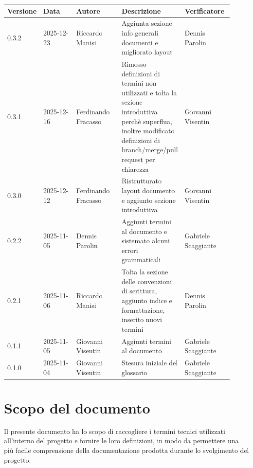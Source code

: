 \documentclass[a4paper,12pt]{article}
\begin{document}
\begin{center}
\small
\renewcommand{\arraystretch}{1.2} 
\begin{tabular}{|p{0.1\linewidth}|p{0.18\linewidth}|p{0.22\linewidth}|p{0.20\linewidth}|p{0.22\linewidth}|}
\hline
\rowcolor{gray!60} 
\textbf{Versione} & \textbf{Data} & \textbf{Autore} & \textbf{Descrizione} & \textbf{Verificatore} \\
\hline
\rowcolor{gray!20}
0.3.2 & 2025-12-23 & Riccardo Manisi & Aggiunta sezione info generali documenti e migliorato layout & Dennis Parolin\\
\hline
\rowcolor{white}
0.3.1 & 2025-12-16 & Ferdinando Fracasso & Rimosso definizioni di termini non utilizzati e tolta la sezione introduttiva perchè superflua, inoltre modificato definizioni di branch/merge/pull request per chiarezza & Giovanni Visentin\\
\hline
\rowcolor{gray!20}
0.3.0 & 2025-12-12 & Ferdinando Fracasso & Ristrutturato layout documento e aggiunto sezione introduttiva & Giovanni Visentin\\
\hline
\rowcolor{white}
0.2.2 & 2025-11-05 & Dennis Parolin & Aggiunti termini al documento e sistemato alcuni errori grammaticali & Gabriele Scaggiante \\
\hline
\rowcolor{gray!20}
0.2.1 & 2025-11-06 & Riccardo Manisi & Tolta la sezione delle convenzioni di scrittura, aggiunto indice e formattazione, inserito nuovi termini & Dennis Parolin \\
\hline
\rowcolor{white}
0.1.1 & 2025-11-05 & Giovanni Visentin & Aggiunti termini al documento & Gabriele Scaggiante \\
\hline
\rowcolor{gray!20}
0.1.0 & 2025-11-04 & Giovanni Visentin & Stesura iniziale del glossario & Gabriele Scaggiante \\
\hline
\end{tabular}
\end{center}

\clearpage

\tableofcontents
\thispagestyle{empty} %
\clearpage

\section{Scopo del documento}
Il presente documento ha lo scopo di raccogliere i termini tecnici utilizzati all'interno del progetto e fornire le loro definizioni, in modo da permettere una più facile comprensione della documentazione prodotta durante lo svolgimento del progetto.
\end{document}
